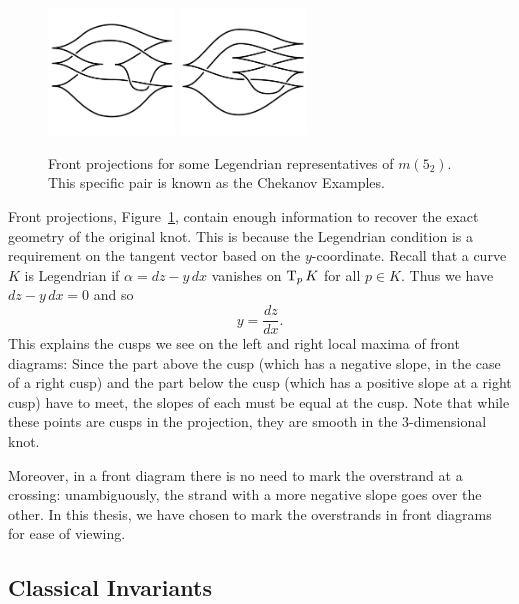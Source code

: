 \begin{figure}[ht]
    \centering
    \includegraphics[width=0.3\textwidth]{images/chekanov-1.pdf}
    \hspace{2em}
    \includegraphics[width=0.3\textwidth]{images/chekanov-2.pdf}
    \caption{Front projections for some Legendrian representatives of $m(5_2)$. This specific pair is known as the Chekanov Examples.}%
    \label{fig:front-projection}
\end{figure}

Front projections, Figure~\ref{fig:front-projection}, contain enough information to recover the exact geometry of the original knot. This is because the Legendrian condition is a requirement on the tangent vector based on the $y$-coordinate. Recall that a curve $K$ is Legendrian if ${\alpha = dz - y\, dx}$ vanishes on $\operatorname{T}_p K$ for all $p \in K$. Thus we have ${dz - y \, dx = 0}$ and so
\[
    y = \frac{dz}{dx}.
\]
This explains the cusps we see on the left and right local maxima of front diagrams: Since the part above the cusp (which has a negative slope, in the case of a right cusp) and the part below the cusp (which has a positive slope at a right cusp) have to meet, the slopes of each must be equal at the cusp. Note that while these points are cusps in the projection, they are smooth in the 3-dimensional knot.

Moreover, in a front diagram there is no need to mark the overstrand at a crossing: unambiguously, the strand with a more negative slope goes over the other. In this thesis, we have chosen to mark the overstrands in front diagrams for ease of viewing.


\subsection{Classical Invariants}\label{subsec:invariants}

